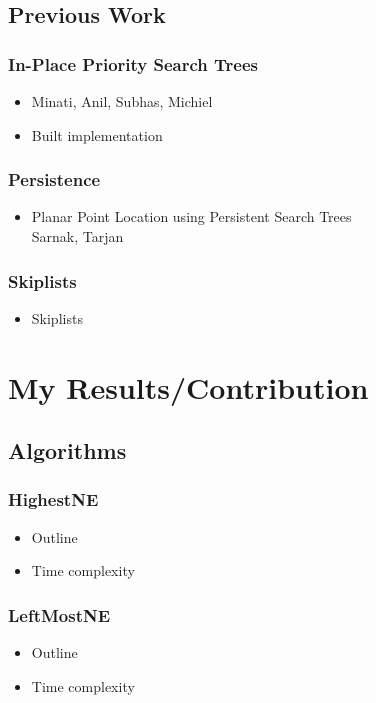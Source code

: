 \documentclass{beamer}
\begin{document}
\subsection{Previous Work}

\begin{frame}
  \frametitle{In-Place Priority Search Trees}
  \begin{itemize}
  \item
    Minati, Anil, Subhas, Michiel
  \item
    Built implementation
  \end{itemize}
\end{frame}

\begin{frame}
  \frametitle{Persistence}

  \begin{itemize}
  \item
    Planar Point Location using Persistent Search Trees\\
    Sarnak, Tarjan
  \end{itemize}
\end{frame}

\begin{frame}
  \frametitle{Skiplists}

  \begin{itemize}
  \item
    Skiplists
  \end{itemize}
\end{frame}

\section{My Results/Contribution}

\subsection{Algorithms}

\begin{frame}
  \frametitle{HighestNE}

  \begin{itemize}
  \item
    Outline 
  \item
    Time complexity
  \end{itemize}
\end{frame}

\begin{frame}
  \frametitle{LeftMostNE}

  \begin{itemize}
  \item
    Outline 
  \item
    Time complexity
  \end{itemize}
\end{frame}
\end{document}
